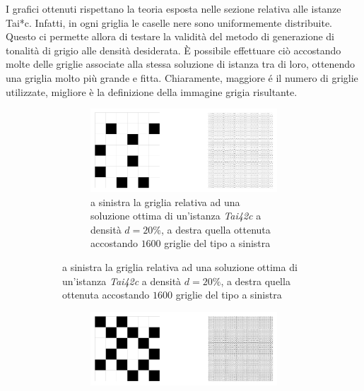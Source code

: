 \newpage \noindent
I grafici ottenuti rispettano la teoria esposta nelle sezione relativa alle istanze Tai*c. Infatti, in ogni griglia le caselle 
nere sono uniformemente distribuite. Questo ci permette allora di testare la validità del metodo di generazione di tonalità di 
grigio alle densità desiderata. È possibile effettuare ciò accostando molte delle griglie associate alla stessa soluzione di istanza tra di loro, 
ottenendo una griglia molto più grande e fitta. Chiaramente, maggiore é il numero di griglie utilizzate, migliore è la definizione 
della immagine grigia risultante.
\begin{figure}[h!]
    \centering
    \begin{subfigure}[b]{\textwidth}
        \centering
        \begin{subfigure}[b]{0.7\textwidth}
            \includegraphics[width=\columnwidth]{images/gray_42_20.png}
            \caption{a sinistra la griglia relativa ad una soluzione ottima di un'istanza \textit{Tai42c} a densità $d=20\%$, 
                \newline a destra quella ottenuta accostando $1600$ griglie del tipo a sinistra}
        \end{subfigure}
    \end{subfigure}
    \centering
    \begin{subfigure}[b]{\textwidth}
        \centering
        \begin{subfigure}[b]{0.7\textwidth}
            \includegraphics[width=\columnwidth]{images/gray_36_40.png}

\end{subfigure}
\end{subfigure}
\end{figure}
